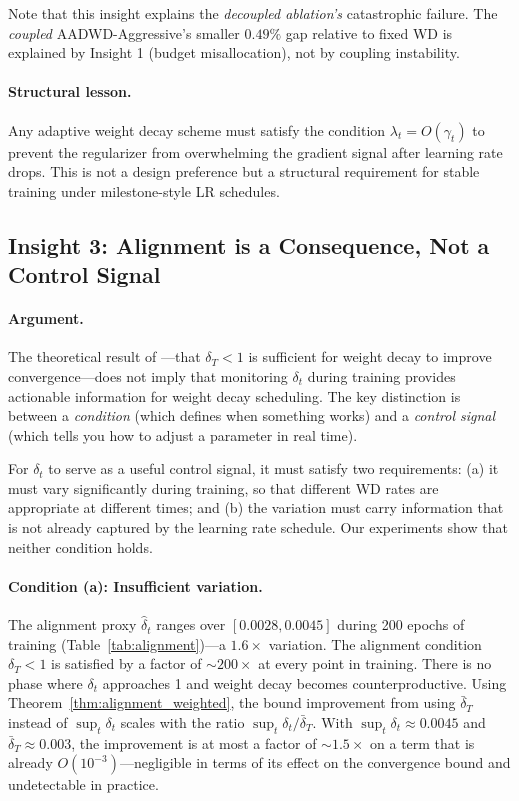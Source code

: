 \documentclass{article}
\begin{document}
Note that this insight explains the \emph{decoupled ablation's} catastrophic failure.
The \emph{coupled} AADWD-Aggressive's smaller $0.49\%$ gap relative to fixed WD is
explained by Insight 1 (budget misallocation), not by coupling instability.

\paragraph{Structural lesson.}
Any adaptive weight decay scheme must satisfy the condition $\lambda_t = O(\gamma_t)$
to prevent the regularizer from overwhelming the gradient signal after learning rate
drops.
This is not a design preference but a structural requirement for stable training
under milestone-style LR schedules.

\subsection{Insight 3: Alignment is a Consequence, Not a Control Signal}

\paragraph{Argument.}
The theoretical result of \citet{xie2024investigating}---that $\delta_T < 1$ is
sufficient for weight decay to improve convergence---does not imply that monitoring
$\delta_t$ during training provides actionable information for weight decay
scheduling.
The key distinction is between a \emph{condition} (which defines when something
works) and a \emph{control signal} (which tells you how to adjust a parameter in
real time).

For $\delta_t$ to serve as a useful control signal, it must satisfy two requirements:
(a) it must vary significantly during training, so that different WD rates are
appropriate at different times; and (b) the variation must carry information that is
not already captured by the learning rate schedule.
Our experiments show that neither condition holds.

\paragraph{Condition (a): Insufficient variation.}
The alignment proxy $\hat{\delta}_t$ ranges over $[0.0028, 0.0045]$ during 200
epochs of training (Table~\ref{tab:alignment})---a $1.6\times$ variation.
The alignment condition $\delta_T < 1$ is satisfied by a factor of $\sim 200\times$
at every point in training.
There is no phase where $\delta_t$ approaches 1 and weight decay becomes
counterproductive.
Using Theorem~\ref{thm:alignment_weighted}, the bound improvement from using
$\bar{\delta}_T$ instead of $\sup_t \delta_t$ scales with the ratio
$\sup_t \delta_t / \bar{\delta}_T$.
With $\sup_t \delta_t \approx 0.0045$ and $\bar{\delta}_T \approx 0.003$, the
improvement is at most a factor of $\sim 1.5\times$ on a term that is already
$O(10^{-3})$---negligible in terms of its effect on the convergence bound and
undetectable in practice.
\end{document}
